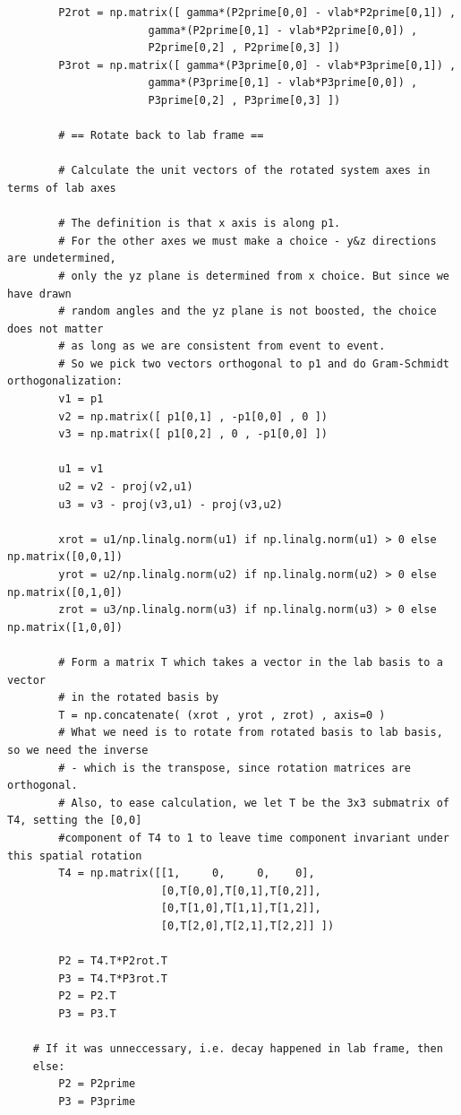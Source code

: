 \documentclass[twoside,english]{uiofysmaster}
\begin{document}
\begin{lstlisting}
		P2rot = np.matrix([ gamma*(P2prime[0,0] - vlab*P2prime[0,1]) , 
				      gamma*(P2prime[0,1] - vlab*P2prime[0,0]) ,
				      P2prime[0,2] , P2prime[0,3] ])
		P3rot = np.matrix([ gamma*(P3prime[0,0] - vlab*P3prime[0,1]) , 
				      gamma*(P3prime[0,1] - vlab*P3prime[0,0]) ,
				      P3prime[0,2] , P3prime[0,3] ])

		# == Rotate back to lab frame ==

		# Calculate the unit vectors of the rotated system axes in terms of lab axes

		# The definition is that x axis is along p1.
		# For the other axes we must make a choice - y&z directions are undetermined,
		# only the yz plane is determined from x choice. But since we have drawn 
		# random angles and the yz plane is not boosted, the choice does not matter
		# as long as we are consistent from event to event.
		# So we pick two vectors orthogonal to p1 and do Gram-Schmidt orthogonalization:
		v1 = p1
		v2 = np.matrix([ p1[0,1] , -p1[0,0] , 0 ])
		v3 = np.matrix([ p1[0,2] , 0 , -p1[0,0] ])

		u1 = v1
		u2 = v2 - proj(v2,u1)
		u3 = v3 - proj(v3,u1) - proj(v3,u2)

		xrot = u1/np.linalg.norm(u1) if np.linalg.norm(u1) > 0 else np.matrix([0,0,1])
		yrot = u2/np.linalg.norm(u2) if np.linalg.norm(u2) > 0 else np.matrix([0,1,0])
		zrot = u3/np.linalg.norm(u3) if np.linalg.norm(u3) > 0 else np.matrix([1,0,0])

		# Form a matrix T which takes a vector in the lab basis to a vector 
		# in the rotated basis by
		T = np.concatenate( (xrot , yrot , zrot) , axis=0 )
		# What we need is to rotate from rotated basis to lab basis, so we need the inverse
		# - which is the transpose, since rotation matrices are orthogonal. 
		# Also, to ease calculation, we let T be the 3x3 submatrix of T4, setting the [0,0]
		#component of T4 to 1 to leave time component invariant under this spatial rotation
		T4 = np.matrix([[1,     0,     0,    0],
						[0,T[0,0],T[0,1],T[0,2]],
						[0,T[1,0],T[1,1],T[1,2]],
						[0,T[2,0],T[2,1],T[2,2]] ])

		P2 = T4.T*P2rot.T
		P3 = T4.T*P3rot.T
		P2 = P2.T
		P3 = P3.T

	# If it was unneccessary, i.e. decay happened in lab frame, then
	else:
		P2 = P2prime
		P3 = P3prime
\end{lstlisting}








\end{document}
